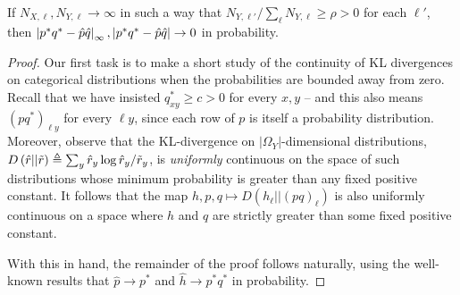 \begin{lem}
\label{lem:easyconsistency} If $N_{X,\ell},N_{Y,\ell}\rightarrow \infty$ in such a way that $N_{Y,\ell'}/\sum_{\ell}N_{Y,\ell} \geq \rho>0$ for each $\ell'$, then $\left|p^*q^*-\hat p\hat q\right|_\infty,\left|p^*q^*-\hat p\hat q\right|\rightarrow 0$ in probability.
\end{lem}
\begin{proof}
Our first task is to make a short study of the continuity of KL divergences on categorical distributions when the probabilities are bounded away from zero.  Recall that we have insisted $q^*_{xy}\geq c>0$ for every $x,y$ -- and this also means $(pq^*)_{\ell y}$ for every $\ell y$, since each row of $p$ is itself a probability distribution.  Moreover, observe that the KL-divergence on $|\Omega_Y|$-dimensional distributions, $D\left(\hat r||\tilde r\right) \triangleq \sum_{y} \hat r_y \log \hat r_y / \tilde r_y$, is \emph{uniformly} continuous on the space of such distributions whose minimum probability is greater than any fixed positive constant.   It follows that the map $h,p,q \mapsto D(h_\ell||(pq)_\ell)$ is also uniformly continuous on a space where $h$ and $q$ are strictly greater than some fixed positive constant.   

With this in hand, the remainder of the proof follows naturally, using the well-known results that $\hat p \rightarrow p^*$ and $\hat h \rightarrow p^*q^*$ in probability.


\end{proof}
